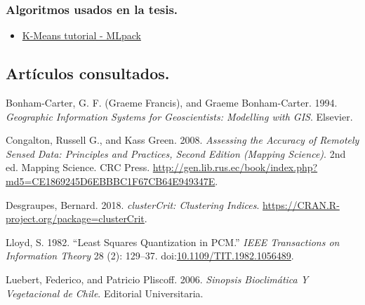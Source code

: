 \documentclass[]{article}
\providecommand{\tightlist}{%
  \setlength{\itemsep}{0pt}\setlength{\parskip}{0pt}}
\begin{document}
\subsubsection*{Algoritmos usados en la
tesis.}\label{algoritmos-usados-en-la-tesis.}

\begin{itemize}
\tightlist
\item
  \href{https://mlpack.org/doc/mlpack-git/doxygen/kmtutorial.html}{K-Means
  tutorial - MLpack}
\end{itemize}

\clearpage

\subsection*{Artículos consultados.}\label{articulos-consultados.}

\providecommand\BIBentryALTinterwordstretchfactor{2.5}



\hypertarget{refs}{}
\hypertarget{ref-bonham-carter_geographic_1994}{}
Bonham-Carter, G. F. (Graeme Francis), and Graeme Bonham-Carter. 1994.
\emph{Geographic Information Systems for Geoscientists: Modelling with
GIS}. Elsevier.

\hypertarget{ref-congalton_assessing_2008}{}
Congalton, Russell G., and Kass Green. 2008. \emph{Assessing the
Accuracy of Remotely Sensed Data: Principles and Practices, Second
Edition (Mapping Science)}. 2nd ed. Mapping Science. CRC Press.
\url{http://gen.lib.rus.ec/book/index.php?md5=CE1869245D6EBBBC1F67CB64E949347E}.

\hypertarget{ref-desgraupes_clustercrit_2018}{}
Desgraupes, Bernard. 2018. \emph{clusterCrit: Clustering Indices}.
\url{https://CRAN.R-project.org/package=clusterCrit}.

\hypertarget{ref-lloyd_least_1982}{}
Lloyd, S. 1982. ``Least Squares Quantization in PCM.'' \emph{IEEE
Transactions on Information Theory} 28 (2): 129--37.
doi:\href{https://doi.org/10.1109/TIT.1982.1056489}{10.1109/TIT.1982.1056489}.

\hypertarget{ref-luebert_sinopsis_2006}{}
Luebert, Federico, and Patricio Pliscoff. 2006. \emph{Sinopsis
Bioclimática Y Vegetacional de Chile}. Editorial Universitaria.
\end{document}
